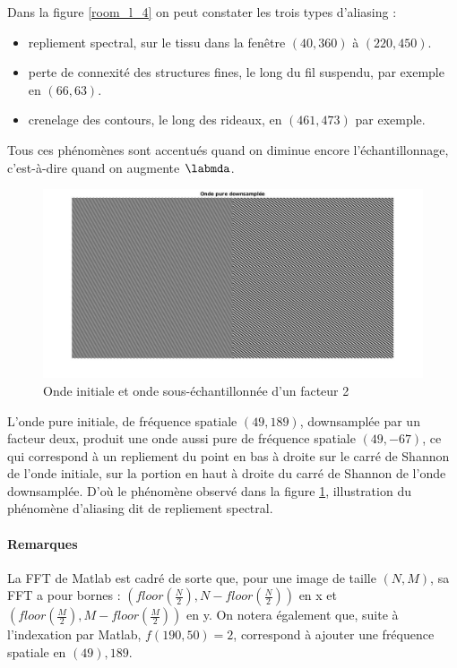 \documentclass[12pt,a4paper,onecolumn]{article}
\begin{document}
Dans la figure \ref{room_l_4} on peut constater les trois types d'aliasing :
\begin{itemize}
	\item repliement spectral, sur le tissu dans la fenêtre $(40, 360)$ à $(220, 450)$.
	\item perte de connexité des structures fines, le long du fil suspendu, par exemple en $(66, 63)$.
	\item crenelage des contours, le long des rideaux, en $(461, 473)$ par exemple.
\end{itemize}
Tous ces phénomènes sont accentués quand on diminue encore l'échantillonnage, c'est-à-dire quand on augmente $\labmda$.

\begin{figure}[H]
\begin{center}
\includegraphics[width = \textwidth]{ex4_onde.jpg}
\end{center}
\caption{Onde initiale et onde sous-échantillonnée d'un facteur 2}
\label{ex4_onde}
\end{figure}

L'onde pure initiale, de fréquence spatiale $(49, 189)$, downsamplée par un facteur deux, produit une onde aussi pure de fréquence spatiale $(49, -67)$, ce qui correspond à un repliement du point en bas à droite sur le carré de Shannon de l'onde initiale, sur la portion en haut à droite du carré de Shannon de l'onde downsamplée. D'où le phénomène observé dans la figure \ref{ex4_onde}, illustration du phénomène d'aliasing dit de repliement spectral.

\paragraph*{Remarques} La FFT de Matlab est cadré de sorte que, pour une image de taille $(N, M)$, sa FFT a pour bornes : $(floor(\frac{N}{2}), N - floor(\frac{N}{2}))$ en x et $(floor(\frac{M}{2}), M - floor(\frac{M}{2}))$ en y.
On notera également que, suite à l'indexation par Matlab, $f(190, 50) = 2$, correspond à ajouter une fréquence spatiale en $(49), 189$.
\end{document}

